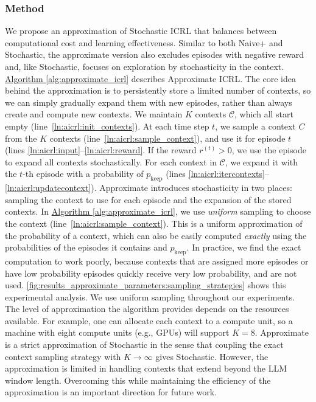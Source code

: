 \documentclass{article}
\theoremstyle{plain}
\theoremstyle{definition}
\theoremstyle{remark}
\newcommand{\autorefalg}[1]{\hyperref[#1]{Algorithm \ref*{#1}}}
\newcommand{\context}{C}
\newcommand{\reward}{r}
\newcommand{\keepprob}{p_\text{keep}}
\newcommand{\contextstore}{\mathcal{C}}
\newcommand{\storagesize}{K}
\newcommand{\explorative}{Stochastic ICRL\xspace}
\newcommand{\approximate}{Approximate ICRL\xspace}
\newcommand{\naiveplusshort}{Naive+\xspace}
\newcommand{\expshort}{Stochastic\xspace}
\newcommand{\appshort}{Approximate\xspace}
\begin{document}
\subsubsection{Method}
We propose an approximation of \explorative that balances between computational cost and learning effectiveness.
Similar to both \naiveplusshort and \expshort, the approximate version also excludes episodes with negative reward and, like \expshort, focuses on exploration by stochasticity in the context.
\autorefalg{alg:approximate_icrl} describes \approximate.
The core idea behind the approximation is to persistently store a limited number of contexts, so we can simply gradually expand them with new episodes, rather than always create and compute new contexts.
We maintain $\storagesize$ contexts $\contextstore$, which all start empty (line~\ref{ln:aicrl:init_contexts}).
At each time step $t$, we sample a context $\context$ from the $\storagesize$ contexts (line~\ref{ln:aicrl:sample_context}), and use it for episode $t$ (lines \ref{ln:aicrl:input}--\ref{ln:aicrl:reward}.
If the reward $\reward^{(t)}>0$, we use the episode to expand all contexts stochastically.
For each context in $\contextstore$, we expand it with the $t$-th episode with a probability of $\keepprob$ (lines \ref{ln:aicrl:itercontexts}--\ref{ln:aicrl:updatecontext}).
\appshort introduces stochasticity in two places: sampling the context to use for each episode and the expansion of the stored contexts.
In \autorefalg{alg:approximate_icrl}, we use \emph{uniform} sampling to choose the context (line~\ref{ln:aicrl:sample_context}).
This is a uniform approximation of the probability of a context, which can also be easily computed \emph{exactly} using the probabilities of the episodes it contains and $\keepprob$.
In practice, we find the exact computation to work poorly, because contexts that are assigned more episodes or have low probability episodes quickly receive very low probability, and are not used.
\autoref{fig:results_approximate_parameters:sampling_strategies} shows this experimental analysis.
We use uniform sampling throughout our experiments.
The level of approximation the algorithm provides depends on the resources available. For example, one can allocate each context to a compute unit, so a machine with eight compute units (e.g., GPUs) will support $\storagesize=8$.
\appshort is a strict approximation of \expshort in the sense that coupling the exact context sampling strategy with $\storagesize \to \infty$ gives \expshort.
However, the approximation is limited in handling contexts that extend beyond the LLM window length. Overcoming this while maintaining the efficiency of the approximation is an important direction for future work.
\end{document}
